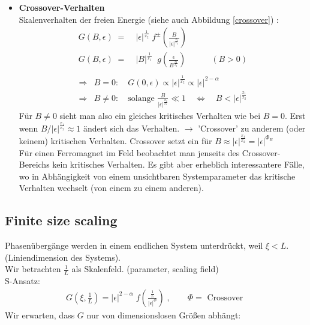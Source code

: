 \documentclass[12pt]{article}
\begin{document}
\begin{itemize}
\item \textbf{Crossover-Verhalten} \\
Skalenverhalten der freien Energie (siehe auch Abbildung \ref{crossover}) :
\begin{align}
G(B,\epsilon) \; =& \;  \vert \epsilon \vert ^\frac{1}{x_2} \; f^\pm \left( \frac{B}{\vert \epsilon \vert ^\frac{x_1}{x_2}} \right) \\
G(B,\epsilon) \; =  & \; \vert B \vert ^\frac{1}{x_1}\;  \; g \left( \frac{\epsilon}{B ^\frac{x_2}{x_2}} \right) \quad \quad \quad (B>0) \\
\end{align}
\begin{align}
\Rightarrow & B=0: \quad  G(0,\epsilon) \propto \vert \epsilon \vert ^\frac{1}{x_2} \propto \vert \epsilon \vert^{2- \alpha} \\
\Rightarrow & B \neq 0: \quad \mbox{solange } \frac{B}{\vert \epsilon \vert ^\frac{x_2}{x_1}} \ll 1 \quad \Leftrightarrow \quad B< \vert \epsilon \vert ^\frac{x_1}{x_2} \end{align}
Für $B\neq 0$ sieht man also ein gleiches kritisches Verhalten wie bei $ B=0.$ Erst wenn $ B/ \vert \epsilon \vert^\frac{x_1}{x_2} \approx 1 $ ändert sich das Verhalten.  $\to$ 'Crossover' zu anderem (oder keinem) kritischen Verhalten. Crossover setzt ein für $B \approx \vert \epsilon \vert^\frac{x_1}{x_2} = \vert \epsilon \vert ^{\Phi_B}$ \\
Für einen Ferromagnet im Feld beobachtet man jenseits des Crossover-Bereichs kein kritisches Verhalten. Es gibt aber erheblich interessantere Fälle, wo in Abhängigkeit von einem unsichtbaren %
 Systemparameter das kritische Verhalten wechselt (von einem zu einem anderen).
\end{itemize}

\subsection{Finite size scaling}
Phasenübergänge werden in einem endlichen System unterdrückt, weil $ \xi < L$. (Liniendimension %
des Systems). \\
Wir betrachten $\frac{1}{L}$ als Skalenfeld. (parameter, scaling field) \\
S-Ansatz: 
\begin{align}G(\xi, \frac{1}{L}) = \vert \epsilon \vert^{2-\alpha} \; f \left( \frac{\frac{1}{L}}{\vert \epsilon \vert^\Phi}\right) \; , \quad \quad \Phi = \mbox{ Crossover }
\end{align}
Wir erwarten, dass $G$ nur von dimensionslosen Größen abhängt:
\end{document}
